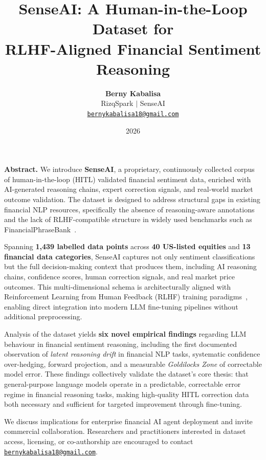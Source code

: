 \documentclass[11pt,a4paper]{article}
\title{%
  \LARGE\bfseries\color{darkblue}
  SenseAI: A Human-in-the-Loop Dataset for\\[4pt]
  RLHF-Aligned Financial Sentiment Reasoning
}
\author{%
  \textbf{Berny Kabalisa}\\[4pt]
  RizqSpark $\mid$ SenseAI\\[2pt]
  \href{mailto:bernykabalisa18@gmail.com}{\texttt{bernykabalisa18@gmail.com}}
}
\date{2026}
\begin{document}

\maketitle
\thispagestyle{empty}

\begin{mdframed}[style=abstractstyle]
\noindent\textbf{Abstract.}\quad
We introduce \textbf{SenseAI}, a proprietary, continuously collected corpus of
human-in-the-loop (HITL) validated financial sentiment data, enriched with
AI-generated reasoning chains, expert correction signals, and real-world market
outcome validation. The dataset is designed to address structural gaps in existing
financial NLP resources, specifically the absence of reasoning-aware annotations
and the lack of RLHF-compatible structure in widely used benchmarks such as
FinancialPhraseBank~\cite{malo2014good}.

Spanning \textbf{1,439 labelled data points} across \textbf{40 US-listed equities}
and \textbf{13 financial data categories}, SenseAI captures not only sentiment
classifications but the full decision-making context that produces them, including
AI reasoning chains, confidence scores, human correction signals, and real market
price outcomes. This multi-dimensional schema is architecturally aligned with
Reinforcement Learning from Human Feedback (RLHF) training
paradigms~\cite{christiano2017deep}, enabling direct integration into modern LLM
fine-tuning pipelines without additional preprocessing.

Analysis of the dataset yields \textbf{six novel empirical findings} regarding LLM
behaviour in financial sentiment reasoning, including the first documented
observation of \textit{latent reasoning drift} in financial NLP tasks, systematic
confidence over-hedging, forward projection, and a measurable \textit{Goldilocks
Zone} of correctable model error. These findings collectively validate the dataset's
core thesis: that general-purpose language models operate in a predictable,
correctable error regime in financial reasoning tasks, making high-quality HITL
correction data both necessary and sufficient for targeted improvement through
fine-tuning.

We discuss implications for enterprise financial AI agent deployment and invite
commercial collaboration. Researchers and practitioners interested in dataset
access, licensing, or co-authorship are encouraged to contact
\href{mailto:bernykabalisa18@gmail.com}{\texttt{bernykabalisa18@gmail.com}}.
\end{mdframed}
\end{document}
